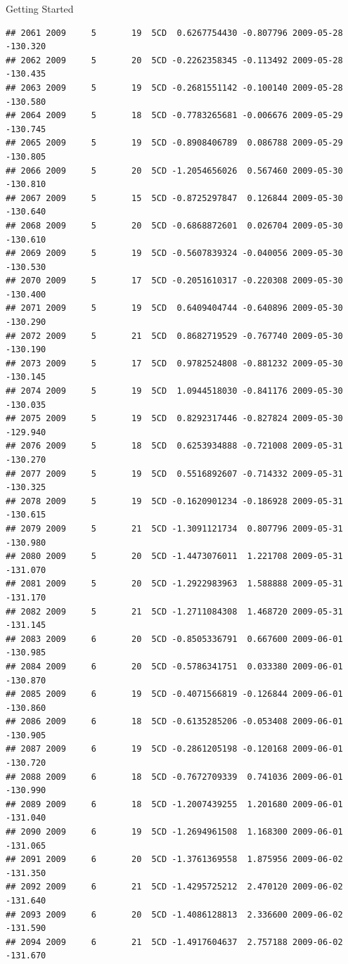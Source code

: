 \documentclass[
  ignorenonframetext,
]{beamer}
\begin{document}
\begin{frame}[fragile]{Getting Started}
\begin{verbatim}
## 2061 2009     5       19  5CD  0.6267754430 -0.807796 2009-05-28 -130.320
## 2062 2009     5       20  5CD -0.2262358345 -0.113492 2009-05-28 -130.435
## 2063 2009     5       19  5CD -0.2681551142 -0.100140 2009-05-28 -130.580
## 2064 2009     5       18  5CD -0.7783265681 -0.006676 2009-05-29 -130.745
## 2065 2009     5       19  5CD -0.8908406789  0.086788 2009-05-29 -130.805
## 2066 2009     5       20  5CD -1.2054656026  0.567460 2009-05-30 -130.810
## 2067 2009     5       15  5CD -0.8725297847  0.126844 2009-05-30 -130.640
## 2068 2009     5       20  5CD -0.6868872601  0.026704 2009-05-30 -130.610
## 2069 2009     5       19  5CD -0.5607839324 -0.040056 2009-05-30 -130.530
## 2070 2009     5       17  5CD -0.2051610317 -0.220308 2009-05-30 -130.400
## 2071 2009     5       19  5CD  0.6409404744 -0.640896 2009-05-30 -130.290
## 2072 2009     5       21  5CD  0.8682719529 -0.767740 2009-05-30 -130.190
## 2073 2009     5       17  5CD  0.9782524808 -0.881232 2009-05-30 -130.145
## 2074 2009     5       19  5CD  1.0944518030 -0.841176 2009-05-30 -130.035
## 2075 2009     5       19  5CD  0.8292317446 -0.827824 2009-05-30 -129.940
## 2076 2009     5       18  5CD  0.6253934888 -0.721008 2009-05-31 -130.270
## 2077 2009     5       19  5CD  0.5516892607 -0.714332 2009-05-31 -130.325
## 2078 2009     5       19  5CD -0.1620901234 -0.186928 2009-05-31 -130.615
## 2079 2009     5       21  5CD -1.3091121734  0.807796 2009-05-31 -130.980
## 2080 2009     5       20  5CD -1.4473076011  1.221708 2009-05-31 -131.070
## 2081 2009     5       20  5CD -1.2922983963  1.588888 2009-05-31 -131.170
## 2082 2009     5       21  5CD -1.2711084308  1.468720 2009-05-31 -131.145
## 2083 2009     6       20  5CD -0.8505336791  0.667600 2009-06-01 -130.985
## 2084 2009     6       20  5CD -0.5786341751  0.033380 2009-06-01 -130.870
## 2085 2009     6       19  5CD -0.4071566819 -0.126844 2009-06-01 -130.860
## 2086 2009     6       18  5CD -0.6135285206 -0.053408 2009-06-01 -130.905
## 2087 2009     6       19  5CD -0.2861205198 -0.120168 2009-06-01 -130.720
## 2088 2009     6       18  5CD -0.7672709339  0.741036 2009-06-01 -130.990
## 2089 2009     6       18  5CD -1.2007439255  1.201680 2009-06-01 -131.040
## 2090 2009     6       19  5CD -1.2694961508  1.168300 2009-06-01 -131.065
## 2091 2009     6       20  5CD -1.3761369558  1.875956 2009-06-02 -131.350
## 2092 2009     6       21  5CD -1.4295725212  2.470120 2009-06-02 -131.640
## 2093 2009     6       20  5CD -1.4086128813  2.336600 2009-06-02 -131.590
## 2094 2009     6       21  5CD -1.4917604637  2.757188 2009-06-02 -131.670

\end{verbatim}
\end{frame}
\end{document}

